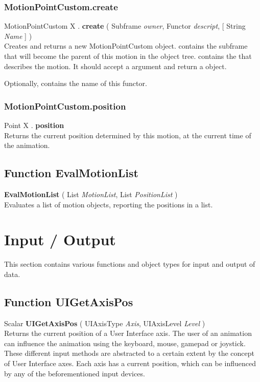 \subsubsection{MotionPointCustom.create \label{F:MotionPointCustom:create}}
MotionPointCustom X . \textbf{create} ( Subframe \textit{owner}, Functor \textit{descript},  [ String \textit{Name} ] ) \\
Creates and returns a new MotionPointCustom object.  contains the subframe that will become the parent of this motion in the object tree.  contains the  that describes the motion. It should accept a  argument and return a  object.

Optionally,  contains the name of this functor.


\subsubsection{MotionPointCustom.position \label{F:MotionPointCustom:position}}
Point X . \textbf{position} \\
Returns the current position determined by this motion, at the current time of the animation.


\subsection{Function EvalMotionList \label{F:EvalMotionList}}
\textbf{EvalMotionList} ( List \textit{MotionList}, List \textit{PositionList} ) \\
Evaluates a list of motion objects, reporting the positions in a list.

\section{Input / Output \label{Input / Output}}
This section contains various functions and object types for input and output of data.

\subsection{Function UIGetAxisPos \label{F:UIGetAxisPos}}
Scalar \textbf{UIGetAxisPos} ( UIAxisType \textit{Axis}, UIAxisLevel \textit{Level} ) \\
Returns the current position of a User Interface axis. The user of an animation can influence the animation using the keyboard, mouse, gamepad or joystick. These different input methods are abstracted to a certain extent by the concept of User Interface axes. Each axis has a current position, which can be influenced by any of the beforementioned input devices.

